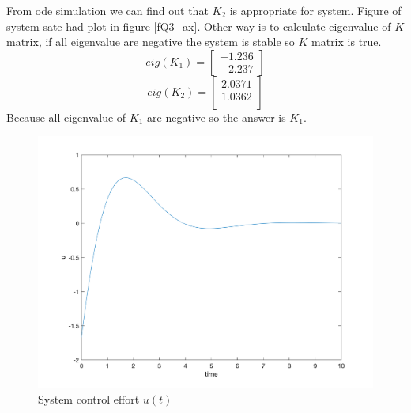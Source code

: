 From ode simulation we can find out that $K_2$ is appropriate for system. Figure of system sate had plot in figure \ref{fQ3_ax}.  Other way is to calculate eigenvalue of $K$ matrix, if all eigenvalue are negative the system is stable so $K$ matrix is true.
$$eig(K_1) = \begin{bmatrix}
 -1.236\\
 -2.237
\end{bmatrix}
$$   
$$eig(K_2) = \begin{bmatrix}
 2.0371\\
 1.0362\\
\end{bmatrix}
$$   
Because all eigenvalue of $K_1$ are negative so the answer is $K_1$. 
\begin{figure}[H]
	\caption{System control effort $u(t)$}
	\centering
	\includegraphics[width=12cm]{../Code/Q3/figures/uODE.png}
\end{figure}